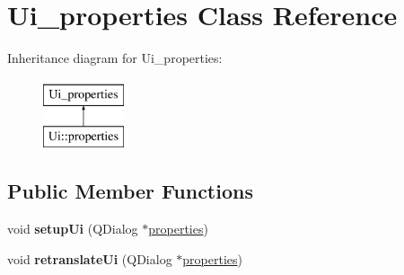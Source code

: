 \hypertarget{classUi__properties}{
\section{Ui\_\-properties Class Reference}
\label{classUi__properties}
}
Inheritance diagram for Ui\_\-properties:\begin{figure}[H]
\begin{center}
\leavevmode
\includegraphics[height=2.000000cm]{classUi__properties}
\end{center}
\end{figure}
\subsection*{Public Member Functions}
\begin{DoxyCompactItemize}
\item 
\hypertarget{classUi__properties_a03ce4f30d999c6f436cfcba2c71153f5}{
void {\bfseries setupUi} (QDialog $\ast$\hyperlink{classproperties}{properties})}
\label{classUi__properties_a03ce4f30d999c6f436cfcba2c71153f5}

\item 
\hypertarget{classUi__properties_ac1d56e369ffb4df607eb2ad3d9598e92}{
void {\bfseries retranslateUi} (QDialog $\ast$\hyperlink{classproperties}{properties})}
\label{classUi__properties_ac1d56e369ffb4df607eb2ad3d9598e92}

\end{DoxyCompactItemize}
